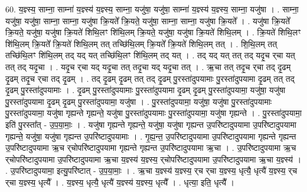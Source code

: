 \documentclass[17pt]{extarticle}
\begin{document}
60. य॒ज्ञ्स्य॒ साम्ना॒ साम्ना॑ य॒ज्ञ्स्य॑ य॒ज्ञ्स्य॒ साम्ना॒ यजु॑षा॒ यजु॑षा॒ साम्ना॑ य॒ज्ञ्स्य॑ य॒ज्ञ्स्य॒ साम्ना॒ यजु॑षा । . साम्ना॒ यजु॑षा॒ यजु॑षा॒ साम्ना॒ साम्ना॒ यजु॑षा क्रि॒यते᳚ क्रि॒यते॒ यजु॑षा॒ साम्ना॒ साम्ना॒ यजु॑षा क्रि॒यते᳚ । . यजु॑षा क्रि॒यते᳚ क्रि॒यते॒ यजु॑षा॒ यजु॑षा क्रि॒यते॑ शिथि॒लꣳ शि॑थि॒लम् क्रि॒यते॒ यजु॑षा॒ यजु॑षा क्रि॒यते॑ शिथि॒लम् । . क्रि॒यते॑ शिथि॒लꣳ शि॑थि॒लम् क्रि॒यते᳚ क्रि॒यते॑ शिथि॒लम् तत् तच्छि॑थि॒लम् क्रि॒यते᳚ क्रि॒यते॑ शिथि॒लम् तत् । . शि॒थि॒लम् तत् तच्छि॑थि॒लꣳ शि॑थि॒लम् तद् यद् यत् तच्छि॑थि॒लꣳ शि॑थि॒लम् तद् यत् । . तद् यद् यत् तत् तद् यदृ॒च र्‌चा यत् तत् तद् यदृ॒चा । . यदृ॒च र्‌चा यद् यदृ॒चा तत् तदृ॒चा यद् यदृ॒चा तत् । . ऋ॒चा तत् तदृ॒च र्‌चा तद् दृ॒ढम् दृ॒ढम् तदृ॒च र्‌चा तद् दृ॒ढम् । . तद् दृ॒ढम् दृ॒ढम् तत् तद् दृ॒ढम् पु॒रस्ता॑दुपयामाः पु॒रस्ता॑दुपयामा दृ॒ढम् तत् तद् दृ॒ढम् पु॒रस्ता॑दुपयामाः । . दृ॒ढम् पु॒रस्ता॑दुपयामाः पु॒रस्ता॑दुपयामा दृ॒ढम् दृ॒ढम् पु॒रस्ता॑दुपयामा॒ यजु॑षा॒ यजु॑षा पु॒रस्ता॑दुपयामा दृ॒ढम् दृ॒ढम् पु॒रस्ता॑दुपयामा॒ यजु॑षा । . पु॒रस्ता॑दुपयामा॒ यजु॑षा॒ यजु॑षा पु॒रस्ता॑दुपयामाः पु॒रस्ता॑दुपयामा॒ यजु॑षा गृह्यन्ते गृह्यन्ते॒ यजु॑षा पु॒रस्ता॑दुपयामाः पु॒रस्ता॑दुपयामा॒ यजु॑षा गृह्यन्ते । . पु॒रस्ता॑दुपयामा॒ इति॑ पु॒रस्ता᳚त् - उ॒प॒या॒माः॒ । . यजु॑षा गृह्यन्ते गृह्यन्ते॒ यजु॑षा॒ यजु॑षा गृह्यन्त उ॒परि॑ष्टादुपयामा उ॒परि॑ष्टादुपयामा गृह्यन्ते॒ यजु॑षा॒ यजु॑षा गृह्यन्त उ॒परि॑ष्टादुपयामाः । . गृ॒ह्य॒न्त॒ उ॒परि॑ष्टादुपयामा उ॒परि॑ष्टादुपयामा गृह्यन्ते गृह्यन्त उ॒परि॑ष्टादुपयामा ऋ॒च र्‌चोपरि॑ष्टादुपयामा गृह्यन्ते गृह्यन्त उ॒परि॑ष्टादुपयामा ऋ॒चा । . उ॒परि॑ष्टादुपयामा ऋ॒च र्‌चोपरि॑ष्टादुपयामा उ॒परि॑ष्टादुपयामा ऋ॒चा य॒ज्ञ्स्य॑ य॒ज्ञ्स्य॒ र्‌चोपरि॑ष्टादुपयामा उ॒परि॑ष्टादुपयामा ऋ॒चा य॒ज्ञ्स्य॑ । . उ॒परि॑ष्टादुपयामा॒ इत्यु॒परि॑ष्टात् - उ॒प॒या॒माः॒ । . ऋ॒चा य॒ज्ञ्स्य॑ य॒ज्ञ्स्य॒ र्‌च र्‌चा य॒ज्ञ्स्य॒ धृत्यै॒ धृत्यै॑ य॒ज्ञ्स्य॒ र्‌च र्‌चा य॒ज्ञ्स्य॒ धृत्यै᳚ । . य॒ज्ञ्स्य॒ धृत्यै॒ धृत्यै॑ य॒ज्ञ्स्य॑ य॒ज्ञ्स्य॒ धृत्यै᳚ । . धृत्या॒ इति॒ धृत्यै᳚ । \newline
\pagebreak
{}
\end{document}
